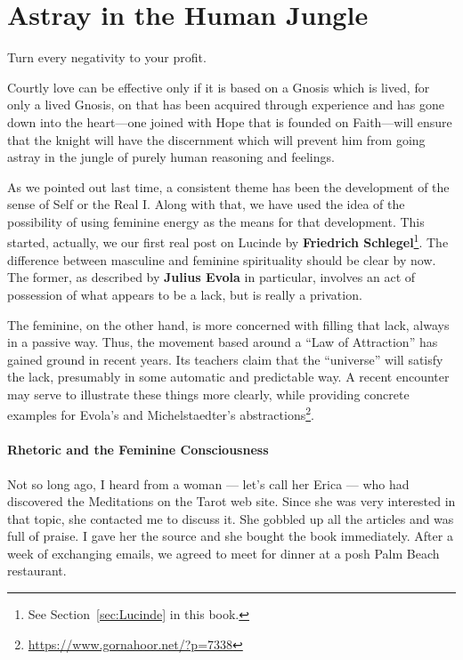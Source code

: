 \section{Astray in the Human Jungle}

\begin{quotex}
Turn every negativity to your profit. 

Courtly love can be effective only if it is based on a Gnosis which is lived, for only a lived Gnosis, on that has been acquired through experience and has gone down into the heart—one joined with Hope that is founded on Faith—will ensure that the knight will have the discernment which will prevent him from going astray in the jungle of purely human reasoning and feelings. 

\end{quotex}
As we pointed out last time, a consistent theme has been the development of the sense of Self or the Real I. Along with that, we have used the idea of the possibility of using feminine energy as the means for that development. This started, actually, we our first real post on Lucinde by \textbf{Friedrich Schlegel}\footnote{See Section~\ref{sec:Lucinde} in this book.}. The difference between masculine and feminine spirituality should be clear by now. The former, as described by \textbf{Julius Evola} in particular, involves an act of possession of what appears to be a lack, but is really a privation.

The feminine, on the other hand, is more concerned with filling that lack, always in a passive way. Thus, the movement based around a “Law of Attraction” has gained ground in recent years. Its teachers claim that the “universe” will satisfy the lack, presumably in some automatic and predictable way. A recent encounter may serve to illustrate these things more clearly, while providing concrete examples for Evola's and Michelstaedter's abstractions\footnote{\url{https://www.gornahoor.net/?p=7338}}.

\paragraph{Rhetoric and the Feminine Consciousness}
Not so long ago, I heard from a woman — let's call her Erica — who had discovered the Meditations on the Tarot web site. Since she was very interested in that topic, she contacted me to discuss it. She gobbled up all the articles and was full of praise. I gave her the source and she bought the book immediately. After a week of exchanging emails, we agreed to meet for dinner at a posh Palm Beach restaurant.

